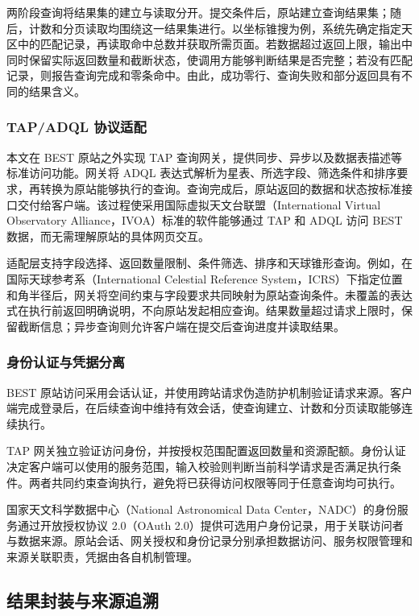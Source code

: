 \documentclass{dcfp}
\begin{document}
\begin{PaperBody}
两阶段查询将结果集的建立与读取分开。提交条件后，原站建立查询结果集；随后，计数和分页读取均围绕这一结果集进行。以坐标锥搜为例，系统先确定指定天区中的匹配记录，再读取命中总数并获取所需页面。若数据超过返回上限，输出中同时保留实际返回数量和截断状态，使调用方能够判断结果是否完整；若没有匹配记录，则报告查询完成和零条命中。由此，成功零行、查询失败和部分返回具有不同的结果含义。

\subsubsection{TAP/ADQL 协议适配}

本文在 BEST 原站之外实现 TAP 查询网关，提供同步、异步以及数据表描述等标准访问功能\citep{ref6}。网关将 ADQL 表达式解析为星表、所选字段、筛选条件和排序要求，再转换为原站能够执行的查询。查询完成后，原站返回的数据和状态按标准接口交付给客户端。该过程使采用国际虚拟天文台联盟（International Virtual Observatory Alliance，IVOA）标准的软件能够通过 TAP 和 ADQL 访问 BEST 数据\citep{ref6,ref13}，而无需理解原站的具体网页交互。

适配层支持字段选择、返回数量限制、条件筛选、排序和天球锥形查询。例如，在国际天球参考系（International Celestial Reference System，ICRS）下指定位置和角半径后，网关将空间约束与字段要求共同映射为原站查询条件。未覆盖的表达式在执行前返回明确说明，不向原站发起相应查询。结果数量超过请求上限时，保留截断信息；异步查询则允许客户端在提交后查询进度并读取结果。

\subsubsection{身份认证与凭据分离}

BEST 原站访问采用会话认证，并使用跨站请求伪造防护机制验证请求来源。客户端完成登录后，在后续查询中维持有效会话，使查询建立、计数和分页读取能够连续执行。

TAP 网关独立验证访问身份，并按授权范围配置返回数量和资源配额。身份认证决定客户端可以使用的服务范围，输入校验则判断当前科学请求是否满足执行条件。两者共同约束查询执行，避免将已获得访问权限等同于任意查询均可执行。

国家天文科学数据中心（National Astronomical Data Center，NADC）的身份服务通过开放授权协议 2.0（OAuth 2.0）提供可选用户身份记录，用于关联访问者与数据来源。原站会话、网关授权和身份记录分别承担数据访问、服务权限管理和来源关联职责，凭据由各自机制管理。

\subsection{结果封装与来源追溯}\label{sec:envelope}


\end{PaperBody}
\end{document}
